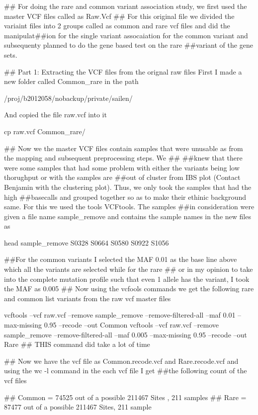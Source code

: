 ## For doing the rare and common variant association study, we first used the master VCF files called as Raw.Vcf 
## For this original file we divided the variaint files into 2 groups called as common and rare vcf files and did the manipulat##ion for the single variant assocaiation for the common variant and subsequenty planned to do the gene based test on the rare ##variant of the gene sets. 

## Part 1: Extracting the VCF files from the orignal raw files
First I made a new folder called Common_rare in the path 

/proj/b2012058/nobackup/private/sailen/

And copied the file raw.vcf into it

cp raw.vcf Common_rare/

## Now we the master VCF files contain samples that were unusable as from the mapping and subsequent preprocessing steps. We ## ##knew that there were some samples that had some problem with either the variants being low thorughput or with the samples are ##out of cluster from IBS plot (Contact Benjamin with the clustering plot). Thus, we only took the samples that had the high ##basecalls and grouped together so as to make their ethinic background same. For this we used the tools VCFtools. The samples ##in consideration were given a file name sample_remove and contains the sample names in the new files as
 
head sample_remove
S0328
S0664
S0580
S0922
S1056

##For the common variants I selected the MAF 0.01 as the base line above which all the variants are selected while for the rare ## or in my opinion to take into the complete mutation profile such that even 1 allele has the variant, I took the MAF as 0.005 ## Now using the vcfools commands we get the following rare and common list variants from the raw vcf master files

 vcftools --vcf raw.vcf --remove sample_remove --remove-filtered-all --maf 0.01 --max-missing 0.95 --recode --out Common
 vcftools --vcf raw.vcf --remove sample_remove --remove-filtered-all --maf 0.005 --max-missing 0.95 --recode --out Rare
 ## THIS command did take a lot of time 
 
 ## Now we have the vcf file as Common.recode.vcf and Rare.recode.vcf and using the wc -l command in the each vcf file I get ##the following count of the vcf files

## Common = 74525 out of a possible 211467 Sites , 211 samples
## Rare = 87477 out of a possible 211467 Sites, 211 sample

